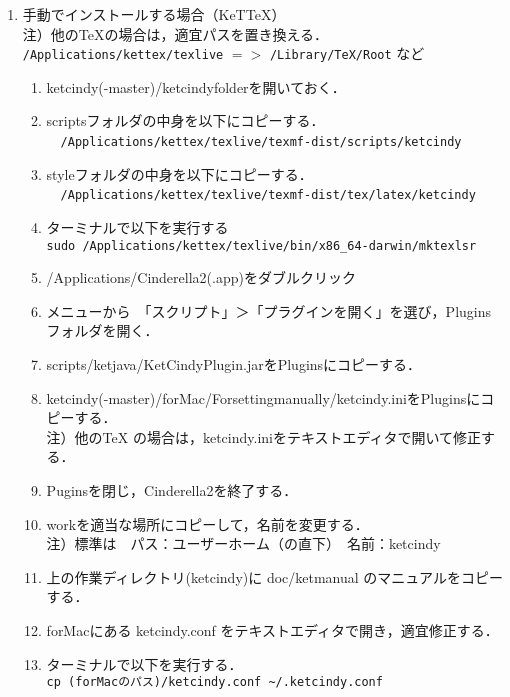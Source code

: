 \documentclass{ujarticle}
\begin{document}
\begin{enumerate}[\bf\large 1.]
\item 手動でインストールする場合（KeTTeX）\\
\hspace*{1zw}注）他のTeXの場合は，適宜パスを置き換える．\\
\hspace*{3zw}\verb|/Applications/kettex/texlive| $=>$ \verb|/Library/TeX/Root| など
  \begin{enumerate}[(1)]
  \item ketcindy(-master)/ketcindyfolderを開いておく．
  \item scriptsフォルダの中身を以下にコピーする．\\
　\verb|/Applications/kettex/texlive/texmf-dist/scripts/ketcindy|
  \item styleフォルダの中身を以下にコピーする．\\
　\verb|/Applications/kettex/texlive/texmf-dist/tex/latex/ketcindy|
  \item ターミナルで以下を実行する\\
  \hspace*{1zw}\verb|sudo /Applications/kettex/texlive/bin/x86_64-darwin/mktexlsr|
  \item /Applications/Cinderella2(.app)をダブルクリック
  \item メニューから　「スクリプト」＞「プラグインを開く」を選び，Pluginsフォルダを開く．
  \item scripts/ketjava/KetCindyPlugin.jarをPluginsにコピーする．
  \item ketcindy(-master)/forMac/Forsettingmanually/ketcindy.iniをPluginsにコピーする．\\
  \hspace*{2zw}注）他のTeX の場合は，ketcindy.iniをテキストエディタで開いて修正する．
  \item Puginsを閉じ，Cinderella2を終了する．
  \item workを適当な場所にコピーして，名前を変更する．\\
\hspace*{2zw}注）標準は　パス：ユーザーホーム（の直下）　名前：ketcindy
  \item 上の作業ディレクトリ(ketcindy)に doc/ketmanual のマニュアルをコピーする．
  \item forMacにある ketcindy.conf をテキストエディタで開き，適宜修正する．
  \item ターミナルで以下を実行する．\\
  \hspace*{1zw}\verb|cp (forMacのパス)/ketcindy.conf ~/.ketcindy.conf|
  \end{enumerate}
\end{enumerate}
\end{document}
